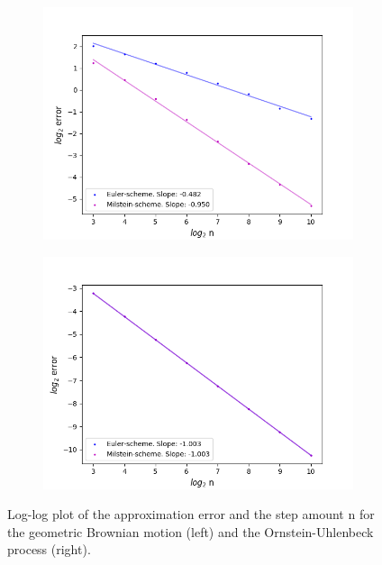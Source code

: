 \begin{figure}[!h]

\centering
   \begin{subfigure}{0.49\linewidth} \centering
     \includegraphics[scale=0.4]{Content/Graphics/Convergence_OrderEulerMilsteinGBM}
   \end{subfigure}
   \begin{subfigure}{0.49\linewidth} \centering
     \includegraphics[scale=0.4]{Content/Graphics/Convergence_OrderEulerMilsteinOU}
   \end{subfigure}
\caption{Log-log plot of the approximation error and the step amount n for the geometric Brownian motion (left) and the Ornstein-Uhlenbeck process (right).} 
\label{fig:convergenceanalysis}
\end{figure}
\vfill

